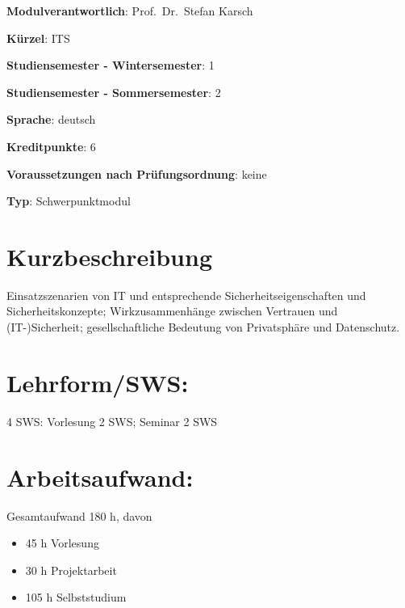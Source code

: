 \begin{modulHead}
\textbf{Modulverantwortlich}: Prof.~Dr.~Stefan
Karsch
\end{modulHead}
\begin{modulHead}
\textbf{Kürzel}:
ITS
\end{modulHead}
\begin{modulHead}
\textbf{Studiensemester -
Wintersemester}:
1
\end{modulHead}
\begin{modulHead}
\textbf{Studiensemester -
Sommersemester}: 2
\end{modulHead}
\begin{modulHead}
\textbf{Sprache}:
deutsch
\end{modulHead}
\begin{modulHead}
\textbf{Kreditpunkte}:
6
\end{modulHead}
\begin{modulHead}
\textbf{Voraussetzungen nach
Prüfungsordnung}: keine
\end{modulHead}
\begin{modulHead}
\textbf{Typ}:
Schwerpunktmodul
\end{modulHead}


\section*{Kurzbeschreibung}\label{kurzbeschreibung-15}

Einsatzszenarien von IT und entsprechende Sicherheitseigenschaften und
Sicherheitskonzepte; Wirkzusammenhänge zwischen Vertrauen und
(IT-)Sicherheit; gesellschaftliche Bedeutung von Privatsphäre und
Datenschutz.

\section*{Lehrform/SWS:}\label{lehrformsws-20}

4 SWS: Vorlesung 2 SWS; Seminar 2 SWS

\section*{Arbeitsaufwand:}\label{arbeitsaufwand-25}

Gesamtaufwand 180 h, davon

\begin{itemize}
\tightlist
\item
  45 h Vorlesung
\item
  30 h Projektarbeit
\item
  105 h Selbststudium
\end{itemize}

